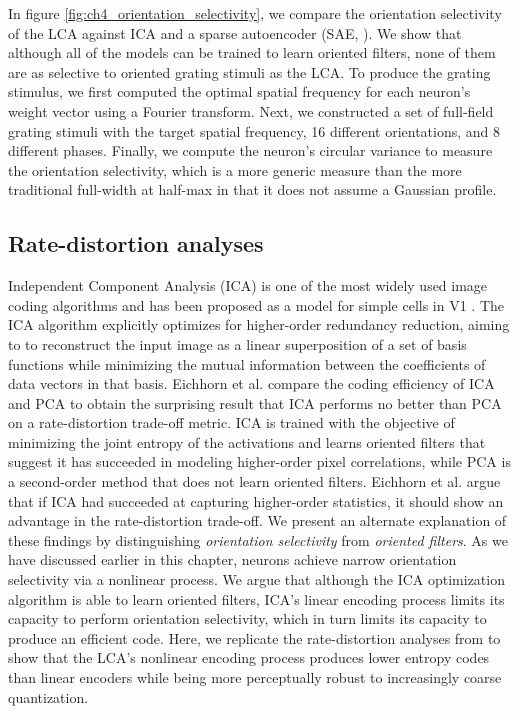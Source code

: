 In figure \ref{fig:ch4_orientation_selectivity}, we compare the orientation selectivity of the LCA against ICA and a sparse autoencoder (SAE, \cite{ng2011sparse}).
We show that although all of the models can be trained to learn oriented filters, none of them are as selective to oriented grating stimuli as the LCA.
To produce the grating stimulus, we first computed the optimal spatial frequency for each neuron's weight vector using a Fourier transform.
Next, we constructed a set of full-field grating stimuli with the target spatial frequency, 16 different orientations, and 8 different phases.
Finally, we compute the neuron's circular variance to measure the orientation selectivity, which is a more generic measure than the more traditional full-width at half-max \parencite{ringach2002orientation} in that it does not assume a Gaussian profile.

\subsection{Rate-distortion analyses}
Independent Component Analysis (ICA) is one of the most widely used image coding algorithms and has been proposed as a model for simple cells in V1 \parencite{bell1997independent, hyvarinen1999fast}.
The ICA algorithm explicitly optimizes for higher-order redundancy reduction, aiming to to reconstruct the input image as a linear superposition of a set of basis functions while minimizing the mutual information between the coefficients of data vectors in that basis.
Eichhorn et al. \citeyearpar{eichhorn2009natural} compare the coding efficiency of ICA and PCA to obtain the surprising result that ICA performs no better than PCA on a rate-distortion trade-off metric.
ICA is trained with the objective of minimizing the joint entropy of the activations and learns oriented filters that suggest it has succeeded in modeling higher-order pixel correlations, while PCA is a second-order method that does not learn oriented filters.
Eichhorn et al. \citeyearpar{eichhorn2009natural} argue that if ICA had succeeded at capturing higher-order statistics, it should show an advantage in the rate-distortion trade-off.
We present an alternate explanation of these findings by distinguishing \textit{orientation selectivity} from \textit{oriented filters}.
As we have discussed earlier in this chapter, neurons achieve narrow orientation selectivity via a nonlinear process.
We argue that although the ICA optimization algorithm is able to learn oriented filters, ICA's linear encoding process limits its capacity to perform orientation selectivity, which in turn limits its capacity to produce an efficient code.
Here, we replicate the rate-distortion analyses from \parencite{eichhorn2009natural} to show that the LCA's nonlinear encoding process produces lower entropy codes than linear encoders while being more perceptually robust to increasingly coarse quantization.


